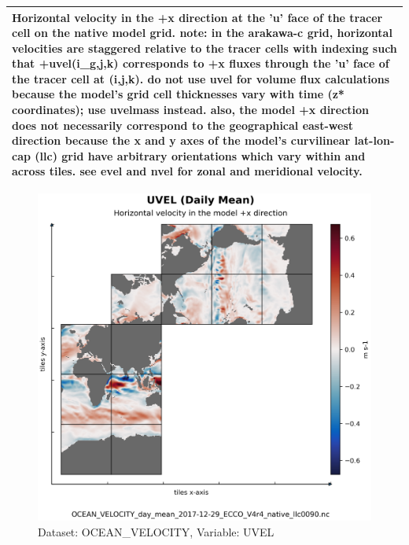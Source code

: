 \begin{longtable}{|m{}|m{}|m{}|m{}|}
\multicolumn{4}{|p{1\textwidth}|}{Horizontal velocity in the +x direction at the 'u' face of the tracer cell on the native model grid. note: in the arakawa-c grid, horizontal velocities are staggered relative to the tracer cells with indexing such that +uvel(i\_g,j,k) corresponds to +x fluxes through the 'u' face of the tracer cell at (i,j,k). do not use uvel for volume flux calculations because the model's grid cell thicknesses vary with time (z* coordinates); use uvelmass instead. also, the model +x direction does not necessarily correspond to the geographical east-west direction because the x and y axes of the model's curvilinear lat-lon-cap (llc) grid have arbitrary orientations which vary within and across tiles. see evel and nvel for zonal and meridional velocity.} \\ \hline
\end{longtable}

\begin{figure}[H]
\centering
\includegraphics[scale=0.55]{../images/plots/native_plots/Ocean_Velocity/UVEL.png}
\caption{Dataset: OCEAN\_VELOCITY, Variable: UVEL}
\label{tab:table-OCEAN_VELOCITY_UVEL-Plot}
\end{figure}
\pagebreak
